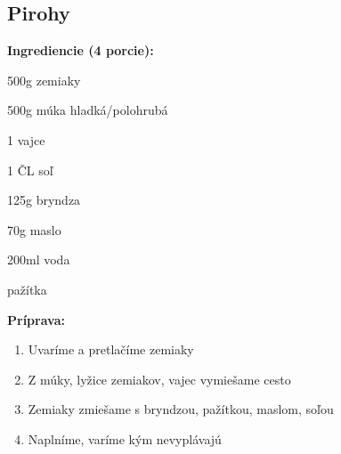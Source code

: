 \setcounter{step}{0}

\subsection{ Pirohy }

\begin{ingredient}
  
  \def\portions{  }
  \textbf{ {\normalsize Ingrediencie (4 porcie):} }

  \begin{main}
      \item 500g zemiaky
      \item 500g múka hladká/polohrubá
      \item 1 vajce
      \item 1 ČL soľ
      \item 125g bryndza
      \item 70g maslo
      \item 200ml voda
      \item pažítka
  \end{main}
  
\end{ingredient}
\begin{recipe}
\textbf{ {\normalsize Príprava:} }
\begin{enumerate}

  \item{Uvaríme a pretlačíme zemiaky}
  \item{Z múky, lyžice zemiakov, vajec vymiešame cesto}
  \item{Zemiaky zmiešame s bryndzou, pažítkou, maslom, soľou}
  \item{Naplníme, varíme kým nevyplávajú}

\end{enumerate}
\end{recipe}

\begin{notes}
  
\end{notes}	
\clearpage
